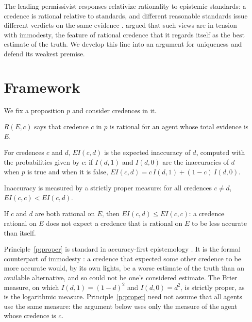 \documentclass{situationist-preprint}
\begin{document}
The leading permissivist responses relativize rationality to epistemic standards: a credence is rational relative to standards, and different reasonable standards issue different verdicts on the same evidence \citep{Schoenfield2014}. \citet{Horowitz2014} argued that such views are in tension with immodesty, the feature of rational credence that it regards itself as the best estimate of the truth. We develop this line into an argument for uniqueness and defend its weakest premise.

\section{Framework}

We fix a proposition $p$ and consider credences in it.

\begin{definition}\label{d:rational}
$R(E,c)$ says that credence $c$ in $p$ is rational for an agent whose total evidence is $E$.
\end{definition}

\begin{definition}\label{d:ei}
For credences $c$ and $d$, $\mathit{EI}(c,d)$ is the expected inaccuracy of $d$, computed with the probabilities given by $c$: if $I(d,1)$ and $I(d,0)$ are the inaccuracies of $d$ when $p$ is true and when it is false, $\mathit{EI}(c,d) = c\,I(d,1) + (1-c)\,I(d,0)$.
\end{definition}

\begin{principle}\label{p:proper}
Inaccuracy is measured by a strictly proper measure: for all credences $c \neq d$, $\mathit{EI}(c,c) < \mathit{EI}(c,d)$.
\end{principle}

\begin{principle}\label{p:endorse}
If $c$ and $d$ are both rational on $E$, then $\mathit{EI}(c,d) \leq \mathit{EI}(c,c)$: a credence rational on $E$ does not expect a credence that is rational on $E$ to be less accurate than itself.
\end{principle}

Principle~\ref{p:proper} is standard in accuracy-first epistemology \citep{Joyce1998,GreavesWallace2006,Pettigrew2016}. It is the formal counterpart of immodesty \citep{Lewis1971}: a credence that expected some other credence to be more accurate would, by its own lights, be a worse estimate of the truth than an available alternative, and so could not be one's considered estimate. The Brier measure, on which $I(d,1) = (1-d)^2$ and $I(d,0) = d^2$, is strictly proper, as is the logarithmic measure. Principle~\ref{p:proper} need not assume that all agents use the same measure: the argument below uses only the measure of the agent whose credence is $c$.
\end{document}
